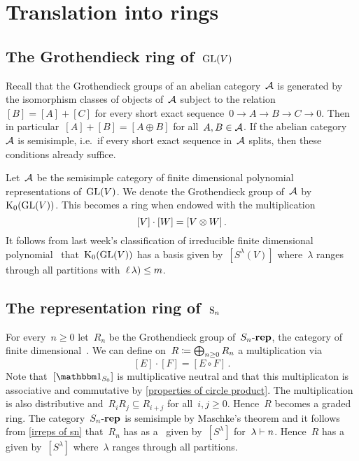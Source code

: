 \documentclass[a4paper,10pt]{scrartcl}
\begin{document}
\section{Translation into rings}



\subsection{The Grothendieck ring of~$\operatorname{GL}(V)$}

Recall that the Grothendieck groups of an abelian category~$\mathcal{A}$ is generated by the isomorphism classes of objects of~$\mathcal{A}$ subject to the relation~$[B] = [A] + [C]$ for every short exact sequence~$0 \to A \to B \to C \to 0$.
Then in particular~$[A] + [B] = [A \oplus B]$ for all~$A, B \in \mathcal{A}$.
If the abelian category~$\mathcal{A}$ is semisimple, i.e.\ if every short exact sequence in~$\mathcal{A}$ splits, then these conditions already suffice.

Let~$\mathcal{A}$ be the semisimple category of finite dimensional polynomial representations of~$\operatorname{GL}(V)$.
We denote the Grothendieck group of~$\mathcal{A}$ by~$\operatorname{K}_0(\operatorname{GL}(V))$.
This becomes a ring when endowed with the multiplication
\[
  [V] \cdot [W]
  =
  [V \otimes W] \,.
\]
It follows from last week’s classification of irreducible finite dimensional polynomial~{} that~$\operatorname{K}_0(\operatorname{GL}(V))$ has a basis given by~$[S^\lambda(V)]$ where~$\lambda$ ranges through all partitions with~$\operatorname{\ell}\lambda) \leq m$.



\subsection{The representation ring of~$\operatorname{S}_n$}

For every~$n \geq 0$ let~$R_n$ be the Grothendieck group of~$S_n\text{-}\mathbf{rep}$, the category of finite dimensional~{}.
We can define on~$R \coloneqq \bigoplus_{n \geq 0} R_n$ a multiplication via
\[
  [E] \cdot [F]
  =
  [E \circ F] \,.
\]
Note that~$[\trivrep_{S_0}]$ is multiplicative neutral and that this multiplicaton is associative and commutative by \cref{properties of circle product}.
The multiplication is also distributive and~$R_i R_j \subseteq R_{i+j}$ for all~$i,j \geq 0$.
Hence~$R$ becomes a graded ring.
The category~$S_n\text{-}\mathbf{rep}$ is semisimple by Maschke’s theorem and it follows from \cref{irreps of sn} that~$R_n$ has as a~{\basis{$\Integer$}} given by~$[S^\lambda]$ for~$\lambda \vdash n$.
Hence~$R$ has a~{\basis{$\Integer$}} given by~$[S^\lambda]$ where~$\lambda$ ranges through all partitions.
\end{document}
